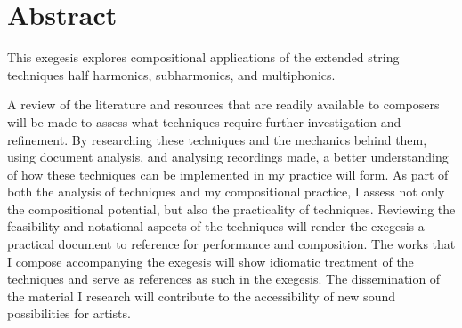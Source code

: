 \chapter*{Abstract}
 

This exegesis explores compositional applications of the extended string techniques half harmonics, subharmonics, and multiphonics.

A review of the literature and resources that are readily available to composers will be made to assess what techniques require further investigation and refinement. 
By researching these techniques and the mechanics behind them, using document analysis, and analysing recordings made, a better understanding of how these techniques can be implemented in my practice will form. 
As part of both the analysis of techniques and my compositional practice, I assess not only the compositional potential, but also the practicality of techniques. 
Reviewing the feasibility and notational aspects of the techniques will render the exegesis a practical document to reference for performance and composition. 
The works that I compose accompanying the exegesis will show idiomatic treatment of the techniques and serve as references as such in the exegesis. 
The dissemination of the material I research will contribute to the accessibility of new sound possibilities for artists. 